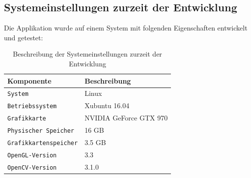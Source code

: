 \subsection{Systemeinstellungen zurzeit der Entwicklung}
Die Applikation wurde auf einem System mit folgenden Eigenschaften entwickelt und getestet:

\begin{table}[H]
\centering
\begin{tabular}{|p{6cm}|p{9cm}|}
\hline
\textbf{Komponente} & \textbf{Beschreibung} \\
\hline
\verb|System| & Linux\\
\hline
\verb|Betriebssystem| & Xubuntu 16.04\\
\hline
\verb|Grafikkarte| & NVIDIA GeForce GTX 970\\
\hline
\verb|Physischer Speicher| & 16 GB \\
\hline
\verb|Grafikkartenspeicher| & 3.5 GB\\
\hline
\verb|OpenGL-Version| & 3.3\\
\hline
\verb|OpenCV-Version| & 3.1.0\\
\hline
\end{tabular}
\caption{Beschreibung der Systemeinstellungen zurzeit der Entwicklung}
\label{tab:SystemSettings}
\end{table}

\newpage
